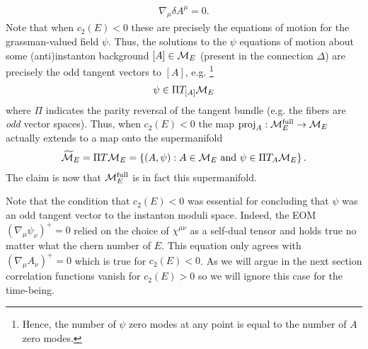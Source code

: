 \documentclass[12pt, onecolumn]{article}
\newenvironment{remark}[1][Remark]{\begin{trivlist}
\item[\hskip \labelsep {\bfseries #1}]}{\end{trivlist}}
\begin{document}
\begin{align*}
\nabla_{\mu}\delta A^{\mu}=0.
\end{align*}
Note that when $c_{2}(E)<0$ these are precisely the equations of motion for the grassman-valued field $\psi$.  Thus, the solutions to the $\psi$ equations of motion about some (anti)instanton background $[A] \in {\cal M}_{E}$ (present in the connection $\Delta$) are precisely the odd tangent vectors to $[A]$, e.g. \footnote{Hence, the number of $\psi$ zero modes at any point is equal to the number of $A$ zero modes.}
\begin{align*}
\psi \in \Pi T_{[A]}{\cal M}_{E}
\end{align*}
where $\Pi$ indicates the parity reversal of the tangent bundle (e.g. the fibers are \textit{odd} vector spaces).  Thus, when $c_{2}(E)<0$ the map $\text{proj}_{A}:{\cal M}^{\text{full}}_{E} \rightarrow {\cal M}_{E}$ actually extends to a map onto the supermanifold
\begin{align*}
\widetilde{{\cal M}}_{E}=\Pi T{\cal M}_{E}=\left \{(A,\psi):\text{$A \in {\cal M}_{E}$ and $\psi \in \Pi T_{A}{\cal M}_{E}$}\right\}.
\end{align*}
The claim is now that ${\cal M}^{\text{full}}_{E}$ is in fact this supermanifold.


\begin{remark}
Note that the condition that $c_{2}(E)<0$ was essential for concluding that $\psi$ was an odd tangent vector to the instanton moduli space.  Indeed, the EOM $(\nabla_{\mu}\psi_{\nu})^{+}=0$ relied on the choice of $\chi^{\mu \nu}$ as a self-dual tensor and holds true no matter what the chern number of $E$.  This equation only agrees with $(\nabla_{\mu}A_{\nu})^{+}=0$ which is true for $c_{2}(E)<0$.  As we will argue in the next section correlation functions vanish for $c_{2}(E)>0$ so we will ignore this case for the time-being.
\end{remark}
\end{document}
